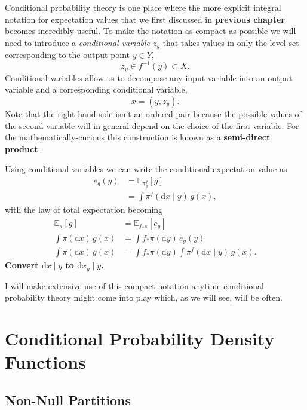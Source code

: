 \documentclass[11pt, oneside]{article}
\newcommand{\E}[2]{
  \ensuremath{ \mathbb{E}_{#1} \! \left[ #2 \right] }
}
\begin{document}
Conditional probability theory is one place where the more explicit integral 
notation for expectation values that we first discussed in \textbf{previous chapter}
becomes incredibly useful.  To make the notation as compact as possible we
will need to  introduce a \emph{conditional variable} $z_{y}$ that takes values 
in only the level set corresponding to the output point $y \in Y$,
%
\begin{equation*}
z_{y} \in f^{-1}(y) \subset X.
\end{equation*}
%
Conditional variables allow us to decompose any input variable into an output 
variable and a corresponding conditional variable,
%
\begin{equation*}
x = (y, z_{y}).
\end{equation*}
%
Note that the right hand-side isn't an ordered pair because the possible
values of the second variable will in general depend on the choice of the 
first variable.  For the mathematically-curious this construction is known 
as a \textbf{semi-direct product}.

Using conditional variables we can write the conditional expectation value as
%
\begin{align*}
e_{g}(y) 
&= 
\E{ \pi^{f}_{y} }{ g }
\\
&=
\int \pi^{f}( \mathrm{d} x \mid y ) \, g(x),
\end{align*}
%
with the law of total expectation becoming
%
\begin{align*}
\E{\pi}{g} 
&= 
\E{ f_{*} \pi }{e_{g}}
\\
\int \pi( \mathrm{d} x ) \, g(x)
&=
\int f_{*} \pi (\mathrm{d} y) \, e_{g}(y)
\\
\int \pi( \mathrm{d} x ) \, g(x)
&=
\int f_{*} \pi (\mathrm{d} y) \int \pi^{f}( \mathrm{d} x \mid y ) \, g(x).
\end{align*}
%
\textbf{Convert $\mathrm{d} x \mid y$ to $\mathrm{d} x_{y} \mid y$.}

I will make extensive use of this compact notation anytime conditional 
probability theory might come into play which, as we will see, will be 
often.

\section{Conditional Probability Density Functions}

\subsection{Non-Null Partitions}
\end{document}
